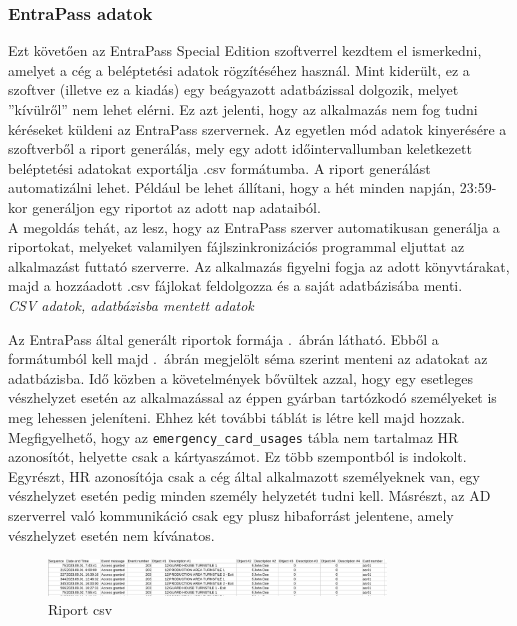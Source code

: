 \documentclass[a4paper]{article}
\newcommand{\inltxt}[1]{\texttt{#1}}
\begin{document}
\subsubsection*{EntraPass adatok}

Ezt követően az EntraPass Special Edition szoftverrel kezdtem el ismerkedni, amelyet a
cég a beléptetési adatok rögzítéséhez használ.
Mint kiderült, ez a szoftver (illetve ez a kiadás) egy beágyazott adatbázissal
dolgozik, melyet ”kívülről” nem lehet elérni. Ez azt jelenti, hogy az alkalmazás nem fog tudni kéréseket küldeni az
EntraPass szervernek. Az egyetlen mód adatok kinyerésére a szoftverből a riport generálás, mely egy adott időintervallumban
keletkezett beléptetési adatokat exportálja .csv formátumba. A riport generálást automatizálni lehet. Például be lehet
állítani, hogy a hét minden napján, 23:59-kor generáljon egy riportot az adott nap adataiból. \\

A megoldás tehát, az lesz, hogy az EntraPass szerver automatikusan generálja a riportokat, melyeket valamilyen fájlszinkronizációs
programmal eljuttat az alkalmazást futtató szerverre. Az alkalmazás figyelni fogja az adott könyvtárakat, majd
a hozzáadott .csv fájlokat feldolgozza és a saját adatbázisába menti. \\

\textit{CSV adatok, adatbázisba mentett adatok}

Az EntraPass által generált riportok formája .~ábrán látható.
Ebből a formátumból kell majd .~ábrán megjelölt séma szerint menteni az adatokat az adatbázisba. Idő közben a követelmények bővültek
azzal, hogy egy esetleges vészhelyzet esetén az alkalmazással az éppen gyárban
tartózkodó személyeket is meg lehessen jeleníteni. Ehhez két további táblát is létre
kell majd hozzak. Megfigyelhető, hogy az \inltxt{emergency_card_usages} tábla nem tartalmaz HR
azonosítót, helyette csak a kártyaszámot. Ez több szempontból is indokolt. Egyrészt,
HR azonosítója csak a cég által alkalmazott személyeknek van, egy vészhelyzet esetén pedig minden személy helyzetét tudni kell.
Másrészt, az AD szerverrel való kommunikáció csak egy plusz hibaforrást jelentene, amely vészhelyzet esetén nem kívánatos.

\begin{figure}[ht]
  \centering
  \includegraphics[width = 0.8\textwidth]{images/csv.png}
  \caption{Riport csv}
  \label{fig:csv_format}
\end{figure}
\end{document}
